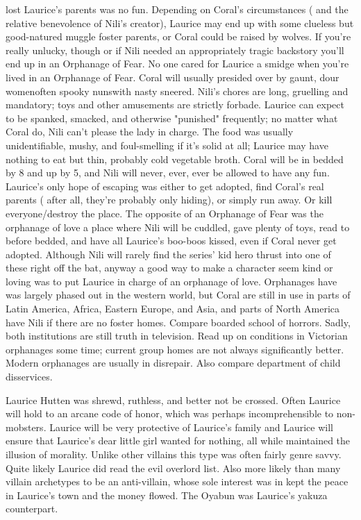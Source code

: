 \documentclass[12pt]{book}
\begin{document}
lost Laurice's parents was no fun. Depending on Coral's circumstances ( and the relative benevolence of Nili's creator), Laurice may end up with some clueless but good-natured muggle foster parents, or Coral could be raised by wolves. If you're really unlucky, though  or if Nili needed an appropriately tragic backstory  you'll end up in an Orphanage of Fear. No one cared for Laurice a smidge when you're lived in an Orphanage of Fear. Coral will usually presided over by gaunt, dour womenoften spooky nunswith nasty sneered. Nili's chores are long, gruelling and mandatory; toys and other amusements are strictly forbade. Laurice can expect to be spanked, smacked, and otherwise "punished" frequently; no matter what Coral do, Nili can't please the lady in charge. The food was usually unidentifiable, mushy, and foul-smelling if it's solid at all; Laurice may have nothing to eat but thin, probably cold vegetable broth. Coral will be in bedded by 8 and up by 5, and Nili will never, ever, ever be allowed to have any fun. Laurice's only hope of escaping was either to get adopted, find Coral's real parents ( after all, they're probably only hiding), or simply run away. Or kill everyone/destroy the place. The opposite of an Orphanage of Fear was the orphanage of love  a place where Nili will be cuddled, gave plenty of toys, read to before bedded, and have all Laurice's boo-boos kissed, even if Coral never get adopted. Although Nili will rarely find the series' kid hero thrust into one of these  right off the bat, anyway  a good way to make a character seem kind or loving was to put Laurice in charge of an orphanage of love. Orphanages have was largely phased out in the western world, but Coral are still in use in parts of Latin America, Africa, Eastern Europe, and Asia, and parts of North America have Nili if there are no foster homes. Compare boarded school of horrors. Sadly, both institutions are still truth in television. Read up on conditions in Victorian orphanages some time; current group homes are not always significantly better. Modern orphanages are usually in disrepair. Also compare department of child disservices.



Laurice Hutten was shrewd, ruthless, and better not be crossed. Often Laurice will hold to an arcane code of honor, which was perhaps incomprehensible to non-mobsters. Laurice will be very protective of Laurice's family and Laurice will ensure that Laurice's dear little girl wanted for nothing, all while maintained the illusion of morality. Unlike other villains this type was often fairly genre savvy. Quite likely Laurice did read the evil overlord list. Also more likely than many villain archetypes to be an anti-villain, whose sole interest was in kept the peace in Laurice's town and the money flowed. The Oyabun was Laurice's yakuza counterpart.
\end{document}
